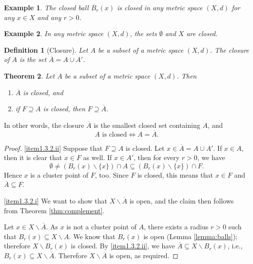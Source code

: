 \documentclass[a4paper,reqno]{amsart}
\numberwithin{equation}{section}
\newtheorem{definition}{Definition}[section]
\newtheorem{theorem}[definition]{Theorem}
\newtheorem{example}{Example}
\begin{document}
\begin{example}
The closed ball $\overline{B}_r(x)$ is closed in any metric space $(X,d)$ for any $x \in X$ and any $r > 0$.
\end{example}

\begin{example}
In any metric space $(X,d)$, the sets $\emptyset$ and $X$ are closed.
\end{example}

\begin{definition}[Closure]
Let $A$ be a subset of a metric space $(X,d)$. The \emph{closure} of $A$
is the set $\overline{A} = A \cup A'$.
\end{definition}

\begin{theorem} \label{thm:closure}
Let $A$ be a subset of a metric space $(X,d)$. Then
\begin{enumerate}
\item \label{item1.3.2.i} $\overline{A}$ is closed, and
\item \label{item1.3.2.ii} if $F \supseteq A$ is closed, then $F \supseteq \overline{A}$.
\end{enumerate}
\end{theorem}

In other words, the closure $\overline{A}$ is the smallest closed set containing $A$, and
$$
A \mbox{ is closed} \Leftrightarrow A = \overline A.
$$



\begin{proof}
\eqref{item1.3.2.ii} Suppose that $F \supseteq A$ is closed. Let
$x \in \overline{A} = A \cup A'$. If $x \in A$, then it is
clear that $x \in F$ as well. If $x \in A'$, then for every
$r > 0$, we have
\[
\emptyset \not= (B_r(x) \backslash \{x\}) \cap A \subseteq (B_r(x) \backslash \{x\}) \cap F.
\]
Hence $x$ is a cluster point of $F$, too. Since $F$ is closed,
this means that $x \in F$ and $\overline{A} \subseteq F$.

\eqref{item1.3.2.i} We want to show that $X \backslash \overline{A}$ is open, and the
claim then follows from Theorem \ref{thm:complement}.

Let $x \in X \backslash \overline{A}$. As $x$ is not a cluster point of $A$,
there exists a radius $r > 0$ such that $B_r(x) \subseteq X \backslash A$.
We know that $B_r(x)$ is open (Lemma \ref{lemma:balls}); therefore  $X \backslash B_r(x)$
is closed. By \eqref{item1.3.2.ii}, we have $\overline{A} \subseteq X \backslash B_r(x)$,
i.e., $B_r(x) \subseteq X \backslash \overline{A}$. Therefore $X \backslash \overline{A}$
is open, as required.
\end{proof}
\end{document}
